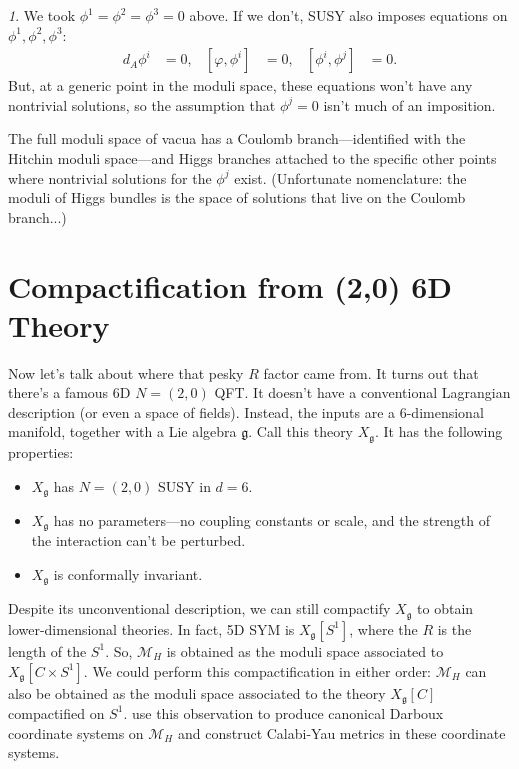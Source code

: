 \documentclass[oneside,english]{amsbook}
\numberwithin{section}{chapter}
\numberwithin{equation}{section}
\numberwithin{figure}{section}
\theoremstyle{plain}
\theoremstyle{definition}
\theoremstyle{remark}
\newtheorem*{rem*}{\protect\remarkname}
\theoremstyle{definition}
\theoremstyle{definition}
\theoremstyle{plain}
\providecommand{\remarkname}{Remark}
\begin{document}
\begin{rem*}
We took $\phi^{1}=\phi^{2}=\phi^{3}=0$ above. If we don't, SUSY also
imposes equations on $\phi^{1},\phi^{2},\phi^{3}$:
\begin{align*}
d_{A}\phi^{i} & =0, & \left[\varphi,\phi^{i}\right] & =0, & \left[\phi^{i},\phi^{j}\right] & =0.
\end{align*}
But, at a generic point in the moduli space, these equations won't
have any nontrivial solutions, so the assumption that $\phi^{j}=0$
isn't much of an imposition.
\end{rem*}
The full moduli space of vacua has a Coulomb branch---identified with
the Hitchin moduli space---and Higgs branches attached to the specific
other points where nontrivial solutions for the $\phi^{j}$ exist.
(Unfortunate nomenclature: the moduli of Higgs bundles is the space
of solutions that live on the Coulomb branch...)


\section{Compactification from (2,0) 6D Theory}

Now let's talk about where that pesky $R$ factor came from. It turns
out that there's a famous 6D $N=\left(2,0\right)$ QFT. It doesn't
have a conventional Lagrangian description (or even a space of fields).
Instead, the inputs are a 6-dimensional manifold, together with a
Lie algebra $\mathfrak{g}$. Call this theory $X_{\mathfrak{g}}$.
It has the following properties:
\begin{itemize}
\item $X_{\mathfrak{g}}$ has $N=\left(2,0\right)$ SUSY in $d=6$.
\item $X_{\mathfrak{g}}$ has no parameters---no coupling constants or scale,
and the strength of the interaction can't be perturbed.
\item $X_{\mathfrak{g}}$ is conformally invariant.
\end{itemize}
Despite its unconventional description, we can still compactify $X_{\mathfrak{g}}$
to obtain lower-dimensional theories. In fact, 5D SYM is $X_{\mathfrak{g}}\left[S^{1}\right]$,
where the $R$ is the length of the $S^{1}$. So, $\mathcal{M}_{H}$
is obtained as the moduli space associated to $X_{\mathfrak{g}}\left[C\times S^{1}\right]$.
We could perform this compactification in either order: $\mathcal{M}_{H}$
can also be obtained as the moduli space associated to the theory
$X_{\mathfrak{g}}\left[C\right]$ compactified on $S^{1}$. \cite{GMN}
use this observation to produce canonical Darboux coordinate systems
on $\mathcal{M}_{H}$ and construct Calabi-Yau metrics in these coordinate
systems.
\end{document}
